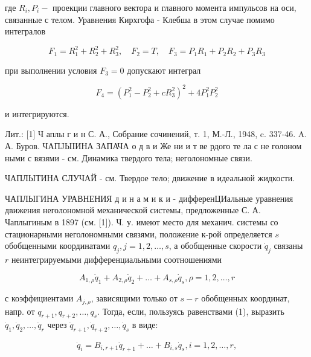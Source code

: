 \documentclass[10pt]{article}
\begin{document}
где $R_{i}, P_{i}-$ проекции главного вектора и главного момента импульсов на оси, связанные с телом. Уравнения Кирхгофа - Клебша в этом случае помимо интегралов



\[

F_{1}=R_{1}^{2}+R_{2}^{2}+R_{3}^{2}, \quad F_{2}=T, \quad F_{3}=P_{1} R_{1}+P_{2} R_{2}+P_{3} R_{3}

\]



при выполнении условия $F_{3}=0$ допускают интеграл



\[

F_{4}=\left(P_{1}^{2}-P_{2}^{2}+c R_{3}^{2}\right)^{2}+4 P_{1}^{2} P_{2}^{2}

\]



и интегрируются.



Лит.: [1] Ч аплы г и н С. А., Собрание сочинений, т. 1, М.-Л., 1948, c. 337-46. A. А. Буров. ЧАПJЫIИНА ЗАПАЧА о д в и Же ни и т ве рдого те ла с не голоном ными с вязями - см. Динамика твердого тела; неголономные связи.



ЧАПЛЫТИНА СЛУЧАЙ - см. Твердое тело; движение в идеальной жидкости.



ЧАПЛЫГИНА УРАВНЕНИЯ д и н а м и к и - дифференЦИальные уравнения движения неголономной механической системы, предложенные С. А. Чаплыгиным в 1897 (см. [1]). Ч. у. имеют место для механич. системы со стационарными неголономными связями, положение к-рой определяется $s$ обобщенными координатами $q_{j}, j=1,2, \ldots, s$, а обобщенные скорости $\dot{q}_{j}$ связаны $r$ неинтегрируемыми дифференциальными соотношениями



\[

A_{1, \rho} \dot{q}_{1}+A_{2, \rho} \dot{q}_{2}+\ldots+A_{s, \rho} \dot{q}_{s}, \rho=1,2, \ldots, r

\]



с коэффициентами $A_{j, \rho}$, зависящими только от $s-r$ обобщенных координат, напр. от $q_{r+1}, q_{r+2}, \ldots, q_{s}$. Тогда, если, пользуясь равенствами (1), выразить $\dot{q}_{1}, \dot{q}_{2}, \ldots, \dot{q}_{r}$ через $\dot{q}_{r+1}, \dot{q}_{r+2}, \ldots, \dot{q}_{s}$ в виде:



\[

\dot{q}_{i}=B_{i, r+1} \dot{q}_{r+1}+\ldots+B_{i, s} \dot{q}_{s}, i=1,2, \ldots, r,

\]
\end{document}

